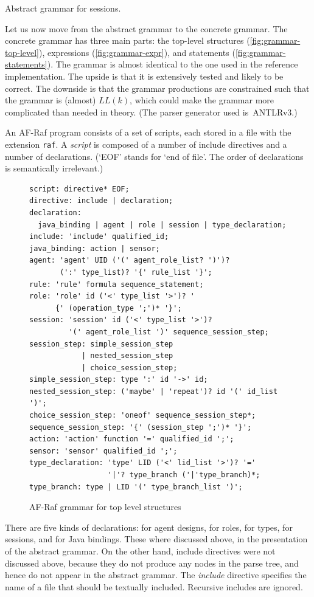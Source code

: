 \documentclass[a4paper,12pt,oneside,fleqn]{book} %
\newcommand{\todo}[1]{[\textcolor{red}{TODO}: #1]}
\renewcommand{\todo}{}
\begin{document}
\todo{Abstract grammar for sessions.}

Let us now move from the abstract grammar to the concrete grammar.  The
concrete grammar has three main parts: the top-level structures
(\autoref{fig:grammar-top-level}), expressions
(\autoref{fig:grammar-expr}), and statements
(\autoref{fig:grammar-statements}). The grammar is almost identical to the
one used in the reference implementation. The upside is that it is
extensively tested and likely to be correct. The downside is that the
grammar productions are constrained such that the grammar is (almost)
$LL(k)$, which could make the grammar more complicated than needed in
theory. (The parser generator used is~ANTLRv3.)

An AF-Raf program consists of a set of scripts, each stored in a file with
the extension {\tt raf}.  A {\it script\/} is composed of a number of
include directives and a number of declarations. (`EOF' stands for `end of
file'. The order of declarations is semantically irrelevant.)

\begin{figure}\footnotesize %
\begin{verbatim}
script: directive* EOF;
directive: include | declaration;
declaration:
  java_binding | agent | role | session | type_declaration;
include: 'include' qualified_id;
java_binding: action | sensor;
agent: 'agent' UID ('(' agent_role_list? ')')?
       (':' type_list)? '{' rule_list '}';
rule: 'rule' formula sequence_statement;
role: 'role' id ('<' type_list '>')? '
      {' (operation_type ';')* '}';
session: 'session' id ('<' type_list '>')?
         '(' agent_role_list ')' sequence_session_step;
session_step: simple_session_step
            | nested_session_step
            | choice_session_step;
simple_session_step: type ':' id '->' id;
nested_session_step: ('maybe' | 'repeat')? id '(' id_list ')';
choice_session_step: 'oneof' sequence_session_step*;
sequence_session_step: '{' (session_step ';')* '}';
action: 'action' function '=' qualified_id ';';
sensor: 'sensor' qualified_id ';';
type_declaration: 'type' LID ('<' lid_list '>')? '='
                  '|'? type_branch ('|'type_branch)*;
type_branch: type | LID '(' type_branch_list ')';
\end{verbatim}
\caption{AF-Raf grammar for top level structures}
\label{fig:grammar-top-level}
\end{figure} %

There are five kinds of declarations: for agent designs, for roles, for
types, for sessions, and for Java bindings. These where discussed above, in
the presentation of the abstract grammar. On the other hand, include
directives were not discussed above, because they do not produce any nodes
in the parse tree, and hence do not appear in the abstract grammar.  The
{\it include} directive specifies the name of a file that should be
textually included. Recursive includes are ignored.
\end{document}

